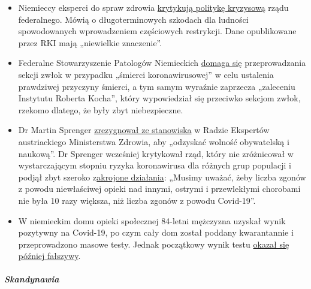 \begin{itemize}
\tightlist
\item
  Niemieccy eksperci do spraw zdrowia
  \href{https://www.tagesschau.de/investigativ/ndr-wdr/corona-experten-thesenpapier-101.html}{krytykują}\href{https://www.tagesschau.de/investigativ/ndr-wdr/corona-experten-thesenpapier-101.html}{
  politykę kryzysową} rządu federalnego. Mówią o długoterminowych
  szkodach dla ludności spowodowanych wprowadzeniem częściowych
  restrykcji. Dane opublikowane przez RKI mają „niewielkie znaczenie''.
\item
  Federalne Stowarzyszenie Patologów Niemieckich
  \href{https://www.pathologie-dgp.de/die-dgp/aktuelles/meldung/pressemitteilung-an-corona-verstorbene-sollten-obduziert-werden/}{domaga
  się} przeprowadzania sekcji zwłok w przypadku „śmierci
  koronawirusowej'' w celu ustalenia prawdziwej przyczyny śmierci, a tym
  samym wyraźnie zaprzecza „zaleceniu Instytutu Roberta Kocha'', który
  wypowiedział się przeciwko sekcjom zwłok, rzekomo dlatego, że były
  zbyt niebezpieczne.
\item
  Dr Martin Sprenger
  \href{https://mailchi.mp/addendum/fles-home-office-260342}{zrezygnował
  ze stanowiska} w Radzie Ekspertów austriackiego Ministerstwa Zdrowia,
  aby „odzyskać wolność obywatelską i naukową''. Dr Sprenger wcześniej
  krytykował rząd, który nie zróżnicował w wystarczającym stopniu ryzyka
  koronawirusa dla różnych grup populacji i podjął zbyt szeroko
  z\href{https://www.addendum.org/coronavirus/interview-sprenger/}{akrojone
  działania}: „Musimy uważać, żeby liczba zgonów z powodu niewłaściwej
  opieki nad innymi, ostrymi i przewlekłymi chorobami nie była 10 razy
  większa, niż liczba zgonów z powodu Covid-19''.
\item
  W niemieckim domu opieki społecznej 84-letni mężczyzna uzyskał wynik
  pozytywny na Covid-19, po czym cały dom został poddany kwarantannie i
  przeprowadzono masowe testy. Jednak początkowy wynik testu
  \href{https://www.schwerin.de/news/4a3e5560-78c9-11ea-b543-1967de695b51/}{okazał
  się później fałszywy}.
\end{itemize}

\hypertarget{skandynawia}{%
\subparagraph{\texorpdfstring{\textbf{Skandynawia}}{Skandynawia}}\label{skandynawia}}

